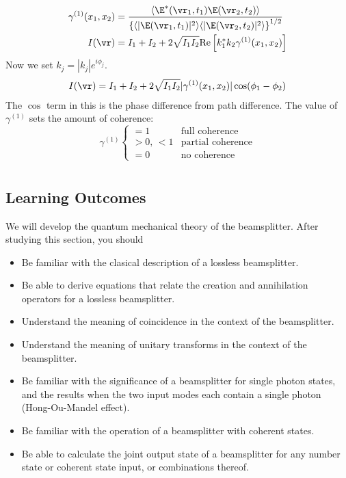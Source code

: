 \documentclass[a4paper, 11pt, normalem]{report}
\begin{document}
\begin{align}
    \gamma^{(1)}(x_1,x_2) &= \frac{\langle\E^*(\vr_1,t_1)\E(\vr_2,t_2)\rangle}{\left\{\langle|\E(\vr_1,t_1)|^2\rangle\langle|\E(\vr_2,t_2)|^2\rangle\right\}^{1/2}} \\
    I(\vr) &= I_1 + I_2 + 2\sqrt{I_1I_2}\text{Re}\left[k_1^*k_2\gamma^{(1)}(x_1,x_2)\right]
\end{align}
Now we set $k_j = |k_j|e^{i\phi_j}$.
\begin{align}
    I(\vr) &= I_1 + I_2 + 2\sqrt{I_1I_2}|\gamma^{(1)}(x_1,x_2)|\cos(\phi_1-\phi_2) \\
\end{align}
The $\cos$ term in this is the phase difference from path difference.
The value of $\gamma^{(1)}$ sets the amount of coherence: 
\begin{equation}
    \gamma^{(1)} \begin{cases} = 1 & \text{full coherence} \\ >0,\,<1 & \text{partial coherence} \\ = 0 & \text{no coherence}\end{cases}
\end{equation}

\chapter{}
\section{Learning Outcomes}
We will develop the quantum mechanical theory of the beamsplitter. 
After studying this section, you should
\begin{itemize}
    \item Be familiar with the clasical description of a lossless beamsplitter.
    \item Be able to derive equations that relate the creation and annihilation operators for a lossless beamsplitter.
    \item Understand the meaning of coincidence in the context of the beamsplitter. 
    \item Understand the meaning of unitary transforms in the context of the beamsplitter. 
    \item Be familiar with the significance of a beamsplitter for single photon states, and the results when the two input modes each contain a single photon (Hong-Ou-Mandel effect).
    \item Be familiar with the operation of a beamsplitter with coherent states. 
    \item Be able to calculate the joint output state of a beamsplitter for any number state or coherent state input, or combinations thereof. 
\end{itemize}
\end{document}
